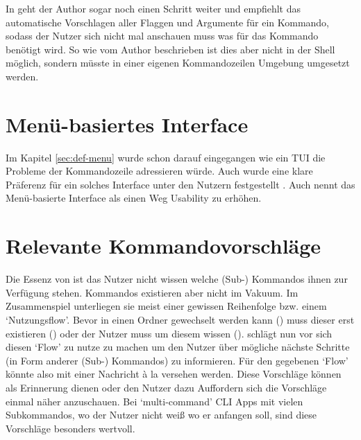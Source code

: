 \documentclass[oneside,bibliography=totocnumbered,BCOR=5mm]{scrbook}
\begin{document}

In \textcite{dutta} geht der Author sogar noch einen Schritt weiter und empfiehlt
das automatische Vorschlagen aller Flaggen und Argumente für ein Kommando,
sodass der Nutzer sich nicht mal anschauen muss was für das Kommando benötigt
wird. So wie vom Author beschrieben ist dies aber nicht in der Shell möglich,
sondern müsste in einer eigenen Kommandozeilen Umgebung umgesetzt werden.

\section{Menü-basiertes Interface}

Im Kapitel \ref{sec:def-menu} wurde schon darauf eingegangen wie ein
TUI die Probleme der Kommandozeile adressieren würde. Auch wurde eine
klare Präferenz für ein solches Interface unter den Nutzern festgestellt
\parencite{Westerman_1997}. Auch \textcite{Spolsky_2001} nennt das Menü-basierte
Interface als einen Weg Usability zu erhöhen.


\section{Relevante Kommandovorschläge}

Die Essenz von  ist das Nutzer nicht wissen welche (Sub-) Kommandos
ihnen zur Verfügung stehen. Kommandos existieren aber nicht im Vakuum. Im
Zusammenspiel unterliegen sie meist einer gewissen Reihenfolge bzw. einem
`Nutzungsflow'. Bevor in einen Ordner gewechselt werden kann ()
muss dieser erst existieren () oder der Nutzer muss um diesem
wissen (). \textcite{dutta} schlägt nun vor sich diesen `Flow'
zu nutze zu machen um den Nutzer über mögliche nächste Schritte (in Form
anderer (Sub-) Kommandos) zu informieren. Für den gegebenen `Flow' könnte
also  mit einer Nachricht à la  versehen werden. Diese Vorschläge können als Erinnerung dienen oder
den Nutzer dazu Auffordern sich die Vorschläge einmal näher anzuschauen. Bei
`multi-command' CLI Apps mit vielen Subkommandos, wo der Nutzer nicht weiß wo er
anfangen soll, sind diese Vorschläge besonders wertvoll.

\end{document}
